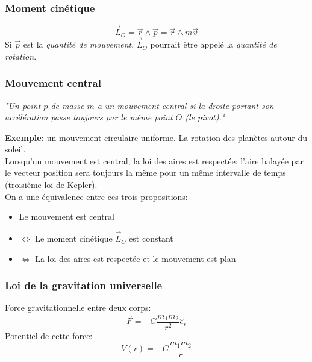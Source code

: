 \documentclass{article}
\numberwithin{equation}{section}
\begin{document}
\subsubsection{Moment cinétique}
\begin{equation}
	\boxed{ \vec L_O = \vec r \wedge \vec p = \vec r \wedge m \vec v }
\end{equation}
Si \(\vec p\) est la \emph{quantité de mouvement}, \(\vec L_O\) pourrait être appelé la \emph{quantité de rotation}.

\subsubsection{Mouvement central}
\begin{center}
	\emph{"Un point \(p\) de masse \(m\) a un mouvement central si la droite portant son accélération passe toujours par le même point \(O\) (le pivot)."}
\end{center}
\textbf{Exemple:} un mouvement circulaire uniforme. La rotation des planètes autour du soleil.\\
Lorsqu'un mouvement est central, la loi des aires est respectée: l'aire balayée par le vecteur position sera toujours la même pour un même intervalle de temps (troisième loi de Kepler). \\

On a une équivalence entre ces trois propositions:
\begin{itemize}
	\item \quad Le mouvement est central
	\item \(\Leftrightarrow\) Le moment cinétique \(\vec L_O\) est constant
	\item \(\Leftrightarrow\) La loi des aires est respectée et le mouvement est plan
\end{itemize}

\subsubsection{Loi de la gravitation universelle}
Force gravitationnelle entre deux corps:
\begin{equation}
	\boxed{ \vec F = -G \dfrac{m_1m_2}{r^2} \hat e_r }
\end{equation}
Potentiel de cette force:
\begin{equation}
	\boxed{ V(r) = -G \dfrac{m_1m_2}{r} }
\end{equation}
\end{document}

